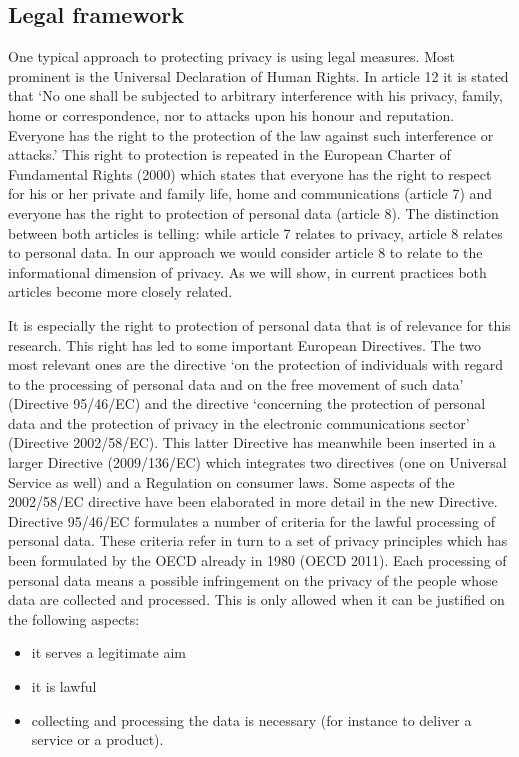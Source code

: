 \subsection{Legal framework}
One typical approach to protecting privacy is using legal measures. Most prominent is the Universal Declaration of Human Rights. In article 12 it is stated that ‘No one shall be subjected to arbitrary interference with his privacy, family, home or correspondence, nor to attacks upon his honour and reputation. Everyone has the right to the protection of the law against	such interference or attacks.’ This right to protection is repeated in the European Charter of	Fundamental Rights (2000) which states that everyone has the right to respect for his or her private and family life, home and communications (article 7) and everyone has the right to protection of personal data (article 8). The distinction between both articles is telling: while article 7 relates to privacy, article 8 relates to personal data. In our approach we would consider article 8 to relate to the informational dimension of privacy. As we will show, in current	practices both articles become more closely related.
	
It is especially the right to protection of personal data that is of relevance for this research. This right has led to some important European Directives. The two most relevant ones are	the directive ‘on the protection of individuals with regard to the processing of personal data	and on the free movement of such data’ (Directive 95/46/EC) and the directive ‘concerning the protection of personal data and the protection of privacy in the electronic communications sector’ (Directive 2002/58/EC). This latter Directive has meanwhile been inserted in a larger Directive (2009/136/EC) which integrates two directives (one on Universal Service as well) and a Regulation on consumer laws. Some aspects of the 2002/58/EC directive have been elaborated in more detail in the new Directive.\\
	
Directive 95/46/EC formulates a number of criteria for the lawful processing of personal data. These criteria refer in turn to a set of privacy principles which has been formulated by the OECD already in 1980 (OECD 2011). Each processing of personal data means a possible infringement on the privacy of the people whose data are collected and processed. This is only allowed when it can be justified on the following aspects:
\begin{itemize}
	\setlength\itemsep{0em}
	\item it serves a legitimate aim
	\item it is lawful
	\item collecting and processing the data is necessary (for instance to deliver a service or a product).
\end{itemize}
	
